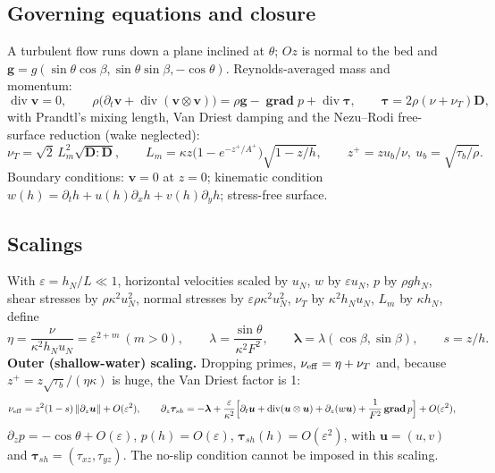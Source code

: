 \documentclass[10pt,a4paper]{article}
\newcommand{\bu}{\bm{u}}
\newcommand{\btau}{\bm{\tau}}
\newcommand{\blam}{\bm{\lambda}}
\newcommand{\grad}{\operatorname{\mathbf{grad}}}
\newcommand{\dvg}{\operatorname{div}}
\begin{document}
\subsection{Governing equations and closure}
A turbulent flow runs down a plane inclined at $\theta$; $Oz$ is normal to the bed and $\bm g=g(\sin\theta\cos\beta,\sin\theta\sin\beta,-\cos\theta)$. Reynolds-averaged mass and momentum:
\begin{equation}
\dvg\bm v=0,\qquad \rho\Big(\partial_t\bm v+\dvg(\bm v\otimes\bm v)\Big)=\rho\bm g-\grad p+\dvg\btau,\qquad \btau=2\rho(\nu+\nu_T)\bm D,
\end{equation}
with Prandtl's mixing length, Van Driest damping and the Nezu--Rodi free-surface reduction (wake neglected):
\begin{equation}\label{eq:Lm}
\nu_T=\sqrt2\,L_m^2\sqrt{\bm D:\bm D},\qquad L_m=\kappa z\big(1-e^{-z^+/A^+}\big)\sqrt{1-z/h},\qquad z^+=zu_b/\nu,\ u_b=\sqrt{\tau_b/\rho}.
\end{equation}
Boundary conditions: $\bm v=0$ at $z=0$; kinematic condition $w(h)=\partial_th+u(h)\partial_xh+v(h)\partial_yh$; stress-free surface.

\subsection{Scalings}
With $\varepsilon=h_N/L\ll1$, horizontal velocities scaled by $u_N$, $w$ by $\varepsilon u_N$, $p$ by $\rho g h_N$, shear stresses by $\rho\kappa^2u_N^2$, normal stresses by $\varepsilon\rho\kappa^2u_N^2$, $\nu_T$ by $\kappa^2h_Nu_N$, $L_m$ by $\kappa h_N$, define
\begin{equation}
\eta=\frac{\nu}{\kappa^2h_Nu_N}=\varepsilon^{2+m}\ (m>0),\qquad \lambda=\frac{\sin\theta}{\kappa^2F^2},\qquad \blam=\lambda(\cos\beta,\sin\beta),\qquad s=z/h .
\end{equation}
\textbf{Outer (shallow-water) scaling.} Dropping primes, $\nu_{\rm eff}=\eta+\nu_T$ and, because $z^+=z\sqrt{\tau_b}/(\eta\kappa)$ is huge, the Van Driest factor is 1:
\begin{equation}\label{eq:outer}
\nu_{\rm eff}=z^2(1-s)\,\|\partial_z\bu\|+O(\varepsilon^2),\qquad
\partial_z\btau_{sh}=-\blam+\frac{\varepsilon}{\kappa^2}\Big[\partial_t\bu+\dvg(\bu\otimes\bu)+\partial_z(w\bu)+\frac{1}{F^2}\grad p\Big]+O(\varepsilon^2),
\end{equation}
$\partial_zp=-\cos\theta+O(\varepsilon)$, $p(h)=O(\varepsilon)$, $\btau_{sh}(h)=O(\varepsilon^2)$, with $\bu=(u,v)$ and $\btau_{sh}=(\tau_{xz},\tau_{yz})$. The no-slip condition cannot be imposed in this scaling.
\end{document}

